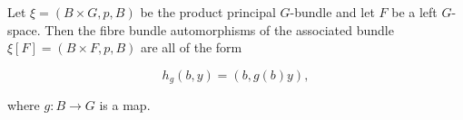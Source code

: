 Let $\xi = (B \times G, p, B)$ be the product principal $G$-bundle and let $F$ be a left $G$-space. Then the fibre bundle automorphisms of the associated bundle $\xi[F] = (B \times F, p, B)$ are all of the form

$$h_g(b, y) = (b, g(b)y),$$

where $g: B \to G$ is a map.
